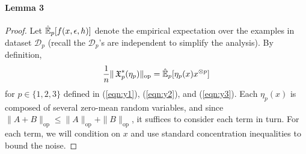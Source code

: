 \documentclass[tablecaption=bottom]{jmlr}
\newcommand\refeqn[1]{(\ref{eqn:#1})}
\newcommand\sD{\ensuremath{\mathcal{D}}}
\newcommand\op{{\textrm{op}}}
\begin{document}
\paragraph{Lemma 3}

\begin{proof}
Let $\hat{\operatorname{\mathbb{E}}}_p[f(x,\epsilon,h)]$ denote the empirical expectation over
the examples in dataset $\sD_p$ (recall the $\sD_p$'s are independent to
simplify the analysis).  By definition,
$$\frac1n \|\opX_p^*(\eta_p)\|_\op = \hat\E_p[\eta_p(x) x\tp{p}]$$
for $p \in \{1,2,3\}$ defined in \refeqn{y1}, \refeqn{y2}, and
\refeqn{y3}. Each $\eta_p(x)$ is composed of several zero-mean random
variables, and since $\|A + B\|_\op \le \|A\|_\op + \|B\|_\op$, it
suffices to consider each term in turn. 
For each term, we will
condition on $x$ and use standard concentration inequalities to bound
the noise. 


\end{proof}
\end{document}

